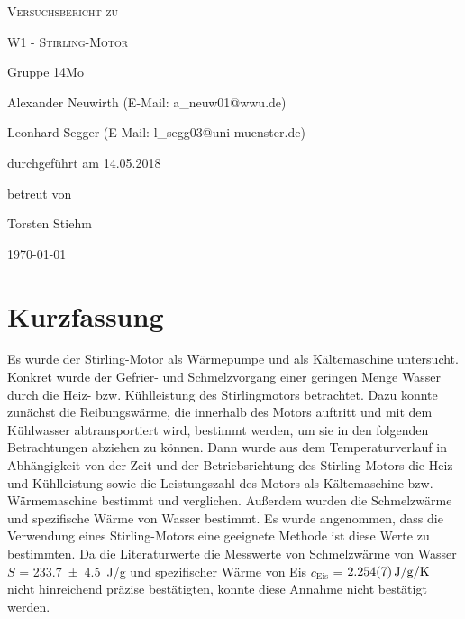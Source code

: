 \documentclass[
	a4paper,
	12pt,
	pagesize,
	ngerman
]{scrartcl}
\begin{document}
	
	\begin{titlepage}
		\centering
		{\scshape\LARGE Versuchsbericht zu \par}
		\vspace{1cm}
		{\scshape\huge W1 - Stirling-Motor \par} 
		\vspace{2.5cm}
		{\LARGE Gruppe 14Mo \par}
		\vspace{0.5cm}
		
		{\large Alexander Neuwirth (E-Mail: a\_neuw01@wwu.de) \par}
		{\large Leonhard Segger (E-Mail: l\_segg03@uni-muenster.de) \par}
		\vfill
		
		durchgeführt am 14.05.2018\par 
		betreut von\par
		{\large Torsten Stiehm} 
		
		\vfill
		
		{\large \today\par}
	\end{titlepage}
	\tableofcontents
	\newpage

	\section{Kurzfassung}
	Es wurde der Stirling-Motor als Wärmepumpe und als Kältemaschine untersucht.
	Konkret wurde der Gefrier- und Schmelzvorgang einer geringen Menge Wasser durch die Heiz- bzw. Kühlleistung des Stirlingmotors betrachtet.
	Dazu konnte zunächst die Reibungswärme, die innerhalb des Motors auftritt und mit dem Kühlwasser abtransportiert wird, bestimmt werden, um sie in den folgenden Betrachtungen abziehen zu können.
	Dann wurde aus dem Temperaturverlauf in Abhängigkeit von der Zeit und der Betriebsrichtung des Stirling-Motors die Heiz- und Kühlleistung sowie die Leistungszahl des Motors als Kältemaschine bzw. Wärmemaschine bestimmt und verglichen.
	Außerdem wurden die Schmelzwärme und spezifische Wärme von Wasser bestimmt.
	Es wurde angenommen, dass die Verwendung eines Stirling-Motors eine geeignete Methode ist diese Werte zu bestimmten.
	Da die Literaturwerte die Messwerte von Schmelzwärme von Wasser $S$ = \SI{233,7\pm 4,5}{J/g} und spezifischer Wärme von Eis $c_\text{Eis}$ = $\SI{2,254+-0,007}{J/g/K}$ nicht hinreichend präzise bestätigten, konnte diese Annahme nicht bestätigt werden.%
	
\end{document}
